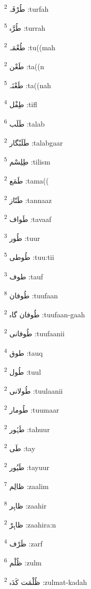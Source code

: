 \documentclass[12pt]{article}
\begin{document}
\begin{RTL}
\begin{multicols}{5}
{\ur طُرْفَہ}   \textsuperscript{2} :turfah

{\ur طُرَّہ}   \textsuperscript{5} :turrah

{\ur طُعْمَہ}   \textsuperscript{2} :tu((mah

{\ur طَعْن}   \textsuperscript{2} :ta((n

{\ur طَعْنَہ}   \textsuperscript{5} :ta((nah

{\ur طِفْل}   \textsuperscript{4} :tifl

{\ur طَلَب}   \textsuperscript{6} :talab

{\ur طَلَبْگار}   \textsuperscript{2} :talabgaar

{\ur طِلِسْم}   \textsuperscript{5} :tilism

{\ur طَمَع}   \textsuperscript{2} :tama((

{\ur طَنّاز}   \textsuperscript{2} :tannaaz

{\ur طَواف}   \textsuperscript{2} :tavaaf

{\ur طُور}   \textsuperscript{3} :tuur

{\ur طُوطی}   \textsuperscript{5} :tuu:tii

{\ur طوف}   \textsuperscript{3} :tauf

{\ur طُوفان}   \textsuperscript{8} :tuufaan

{\ur طُوفان گاہ}   \textsuperscript{2} :tuufaan-gaah

{\ur طُوفانی}   \textsuperscript{2} :tuufaanii

{\ur طوق}   \textsuperscript{4} :tauq

{\ur طُول}   \textsuperscript{2} :tuul

{\ur طُولانی}   \textsuperscript{2} :tuulaanii

{\ur طُومار}   \textsuperscript{2} :tuumaar

{\ur طَہُور}   \textsuperscript{2} :tahuur

{\ur طَی}   \textsuperscript{2} :tay

{\ur طَیُور}   \textsuperscript{2} :tayuur

{\ur ظالِم}   \textsuperscript{7} :zaalim

{\ur ظاہِر}   \textsuperscript{8} :zaahir

{\ur ظاہِرًَ}   \textsuperscript{2} :zaahira:n

{\ur ظَرْف}   \textsuperscript{4} :zarf

{\ur ظُلْم}   \textsuperscript{6} :zulm

{\ur ظُلْمَت کَدَہ}   \textsuperscript{2} :zulmat-kadah


\end{multicols}
\end{RTL}
\end{document}
